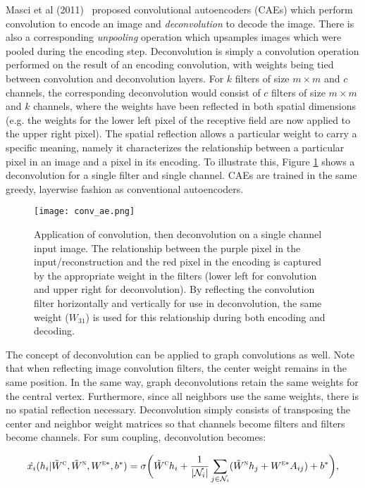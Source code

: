 Masci et al (2011)~\cite{masci2011} proposed convolutional autoencoders (CAEs) which perform convolution to encode an image and \emph{deconvolution} to decode the image.
There is also a corresponding \emph{unpooling} operation which upsamples images which were pooled during the encoding step.
Deconvolution is simply a convolution operation performed on the result of an encoding convolution, with weights being tied between convolution and deconvolution layers.
For $k$ filters of size $m \times m$ and $c$ channels, the corresponding deconvolution would consist of $c$ filters of size $m \times m$ and $k$ channels, where the weights have been reflected in both spatial dimensions (e.g. the weights for the lower left pixel of the receptive field are now applied to the upper right pixel).
The spatial reflection allows a particular weight to carry a specific meaning, namely it characterizes the relationship between a particular pixel in an image and a pixel in its encoding.
To illustrate this, Figure \ref{fig:deconv} shows a deconvolution for a single filter and single channel.
CAEs are trained in the same greedy, layerwise fashion as conventional autoencoders.

\begin{figure}
	\texttt{[image: conv\_ae.png]}
	\caption{Application of convolution, then deconvolution on a single channel input image. The relationship between the purple pixel in the input/reconstruction and the red pixel in the encoding is captured by the appropriate weight in the filters (lower left for convolution and upper right for deconvolution). By reflecting the convolution filter horizontally and vertically for use in deconvolution, the same weight ($W_{31}$) is used for this relationship during both encoding and decoding.
		\label{fig:deconv}}
\end{figure}


The concept of deconvolution can be applied to graph convolutions as well.
Note that when reflecting image convolution filters, the center weight remains in the same position.
In the same way, graph deconvolutions retain the same weights for the central vertex. 
Furthermore, since all neighbors use the same weights, there is no spatial reflection necessary.
Deconvolution simply consists of transposing the center and neighbor weight matrices so that channels become filters and filters become channels.
For sum coupling, deconvolution becomes:

\begin{equation}
\hat{x_i}(h_i | \tilde{W}^\textsc{c}, \tilde{W}^\textsc{n}, W^{\textsc{e}*}, b^*) = \sigma \bigg( \tilde{W}^{\textsc{c}} h_i + \frac{1}{|\mathcal{N}_i|}\sum_{j \in \mathcal{N}_i} (\tilde{W}^{\textsc{n}} h_j + W^{\textsc{e}*} A_{ij}) + b^* \bigg),
\label{eq:sum_deconv}
\end{equation}

